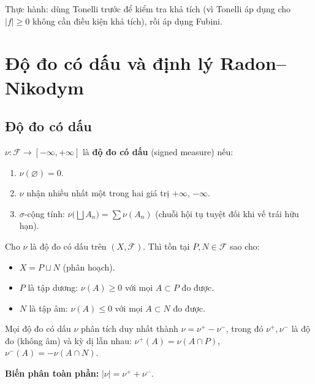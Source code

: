 \documentclass[12pt,a4paper]{article}
\begin{document}
\begin{luuy}
  Thực hành: dùng Tonelli trước để kiểm tra khả tích (vì Tonelli áp dụng cho $|f| \ge 0$ không cần điều kiện khả tích), rồi áp dụng Fubini.
\end{luuy}

\section{Độ đo có dấu và định lý Radon--Nikodym}

\subsection{Độ đo có dấu}

\begin{dinhnghia}
  $\nu: \mathcal{F} \to [-\infty, +\infty]$ là \textbf{độ đo có dấu} (signed measure) nếu:
  \begin{enumerate}
    \item $\nu(\varnothing) = 0$.
    \item $\nu$ nhận nhiều nhất một trong hai giá trị $+\infty$, $-\infty$.
    \item $\sigma$-cộng tính: $\nu\bigl(\bigsqcup A_n\bigr) = \sum \nu(A_n)$ (chuỗi hội tụ tuyệt đối khi vế trái hữu hạn).
  \end{enumerate}
\end{dinhnghia}

\begin{dinhly}[title={Phân tích Hahn}]
  Cho $\nu$ là độ đo có dấu trên $(X, \mathcal{F})$. Thì tồn tại $P, N \in \mathcal{F}$ sao cho:
  \begin{itemize}
    \item $X = P \sqcup N$ (phân hoạch).
    \item $P$ là tập dương: $\nu(A) \ge 0$ với mọi $A \subset P$ đo được.
    \item $N$ là tập âm: $\nu(A) \le 0$ với mọi $A \subset N$ đo được.
  \end{itemize}
\end{dinhly}

\begin{dinhly}[title={Phân tích Jordan}]
  Mọi độ đo có dấu $\nu$ phân tích duy nhất thành $\nu = \nu^+ - \nu^-$, trong đó $\nu^+, \nu^-$ là độ đo (không âm) và kỳ dị lẫn nhau: $\nu^+(A) = \nu(A \cap P)$, $\nu^-(A) = -\nu(A \cap N)$.

  \textbf{Biến phân toàn phần:} $|\nu| = \nu^+ + \nu^-$.
\end{dinhly}
\end{document}

